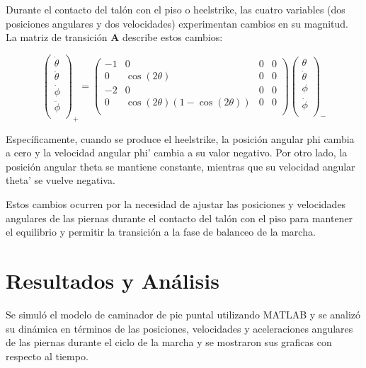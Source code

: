 \documentclass[journal,transmag]{IEEEtran}
\begin{document}
\begin{itemize}
Durante el contacto del talón con el piso o heelstrike, las cuatro variables (dos posiciones angulares y dos velocidades) experimentan cambios en su magnitud. La matriz de transición \textbf{A} describe estos cambios: 

\begin{equation*}
\begin{pmatrix}
\dot{\theta} \\
\ddot{\theta} \\
\dot{\phi} \\
\ddot{\phi} \\
\end{pmatrix}_{+} = 
\begin{pmatrix}
-1 & 0 & 0 & 0 \\
0 & \cos(2\theta) & 0 & 0 \\
-2 & 0 & 0 & 0 \\
0 & \cos(2\theta)(1-\cos(2\theta)) & 0 & 0 \\
\end{pmatrix}
\begin{pmatrix}
\theta \\
\dot{\theta} \\
\phi \\
\dot{\phi} \\
\end{pmatrix}_{-}
\end{equation*}


Específicamente, cuando se produce el heelstrike, la posición angular phi cambia a cero y la velocidad angular phi' cambia a su valor negativo. Por otro lado, la posición angular theta se mantiene constante, mientras que su velocidad angular theta' se vuelve negativa.

Estos cambios ocurren por la necesidad de ajustar las posiciones y velocidades angulares de las piernas durante el contacto del talón con el piso para mantener el equilibrio y permitir la transición a la fase de balanceo de la marcha.


\end{itemize}





\section{Resultados y Análisis} 
Se simuló el modelo de caminador de pie puntal utilizando MATLAB y se analizó su dinámica en términos de las posiciones, velocidades y aceleraciones angulares de las piernas durante el ciclo de la marcha y se mostraron sus graficas con respecto al tiempo.  
\end{document}
